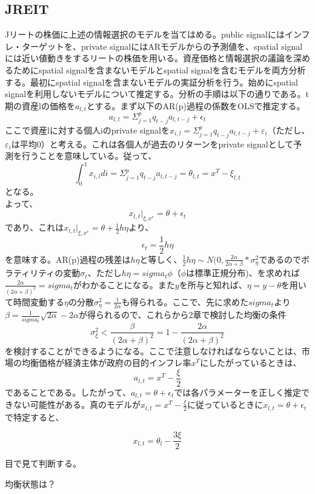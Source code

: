\documentclass{jsarticle}
\begin{document}
\subsection{JREIT}
Jリートの株価に上述の情報選択のモデルを当てはめる。public signalにはインフレ・ターゲットを、private signalにはARモデルからの予測値を、spatial signalには近い値動きをするリートの株価を用いる。資産価格と情報選択の議論を深めるためにspatial signalを含まないモデルとspatial signalを含むモデルを両方分析する。最初にspatial signalを含まないモデルの実証分析を行う。始めにspatial signalを利用しないモデルについて推定する。分析の手順は以下の通りである。t期の資産lの価格を$a_{l,t}$とする。まず以下のAR(p)過程の係数をOLSで推定する。
$$ a_{l,t} = \Sigma^{p}_{j=1} q_{t-j}a_{l,t-j} + \epsilon_{t} $$
ここで資産lに対する個人iのprivate signalを$x_{i, l} = \Sigma^{p}_{j=1} q_{t-j}a_{l,t-j} + \varepsilon_{i}$（ただし、$\varepsilon_{i}$は平均0）と考える。これは各個人が過去のリターンをprivate signalとして予測を行うことを意味している。従って、
$$\int^{1}_{0}x_{i, l}di = \Sigma^{p}_{j=1} q_{t-j}a_{l,t-j} = \theta_{l, t} = x^{T} - \xi_{l, t}$$
となる。\\
よって、
$$ x_{l,t}|_{\xi, x^{e}} = \theta + \epsilon_{t} $$
であり、これは$ x_{l,t}|_{\xi, x^{e}} = \theta + \frac{1}{2}h\eta $より、
$$ \epsilon_{t} = \frac{1}{2}h\eta$$
を意味する。AR(p)過程の残差は$h\eta$と等しく、$\frac{1}{2}h\eta \sim N(0, \frac{2\alpha}{2\alpha + \beta}*\sigma^2_{\eta}$であるのでボラティリティの変動$\sigma_{t}$、ただし$h\eta = sigma_{t}\phi$（$\phi$は標準正規分布)、を求めれば$\frac{2\alpha}{(2\alpha + \beta)^2} = sigma_{t}$がわかることになる。また$y$を所与と知れば、$\eta = y - \theta$を用いて時間変動する$\eta$の分散$\sigma^2_{\eta} = \frac{1}{2\alpha}$も得られる。ここで、先に求めた$sigma_{t}$より$\beta = \frac{1}{sigma_{t}}\sqrt{2\alpha} - 2\alpha$が得られるので、これらから2章で検討した均衡の条件
$$\sigma^2_{\xi} < \frac{\beta}{(2\alpha + \beta)^2} = 1 - \frac{2\alpha}{(2\alpha + \beta)^2}$$
を検討することができるようになる。ここで注意しなければならないことは、市場の均衡価格が経済主体が政府の目的インフレ率$x^{T}$にしたがっているときは、
$$ a_{l,t} = x^{T} - \frac{\xi}{2}$$であることである。したがって、$ a_{l,t} = \theta + \epsilon_{t} $では各パラメーターを正しく推定できない可能性がある。真のモデルが$ x_{l,t} = x^{T} - \frac{\xi}{2}$に従っているときに$ x_{l,t} = \theta + \epsilon_{t}$で特定すると、

$$ x_{l,t} = \theta_{l} - \frac{3\xi}{2}$$

目で見て判断する。

均衡状態は？
\end{document}
